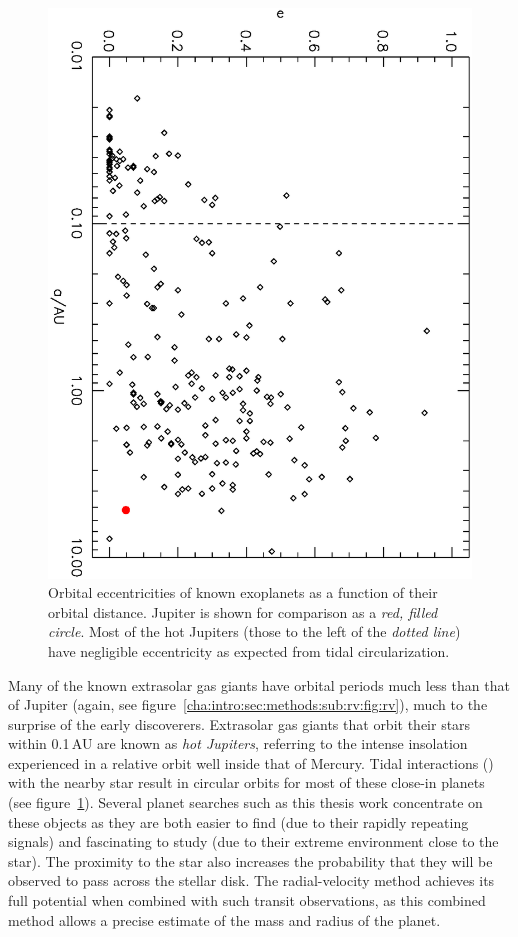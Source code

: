 \begin{figure}
\begin{center}
\centering
\includegraphics[angle=90,width=.90\textwidth]{1_rvplanetseccs}
\caption[Orbital eccentricity distribution of known exoplanets]{%
Orbital eccentricities of known exoplanets as a function of their orbital distance.
Jupiter is shown for comparison as a {\it red, filled circle}.
Most of the hot Jupiters (those to the left of the {\it dotted line}) have negligible eccentricity as expected from tidal circularization.%
}
\label{cha:intro:sec:methods:sub:rv:fig:rve}
\end{center}
\end{figure}

Many of the known extrasolar gas giants have orbital periods much less than that of Jupiter (again, see figure~\ref{cha:intro:sec:methods:sub:rv:fig:rv}), much to the surprise of the early discoverers. 
Extrasolar gas giants that orbit their stars within 0.1\,AU are known as {\it hot Jupiters}, referring to the intense insolation experienced in a relative orbit well inside that of Mercury. 
Tidal interactions (\citealp[see, e.g.,][]{Rasio_Ford:Science:1996a}) with the nearby star result in circular orbits for most of these close-in planets (see figure~\ref{cha:intro:sec:methods:sub:rv:fig:rve}). 
Several planet searches such as this thesis work concentrate on these objects as they are both easier to find (due to their rapidly repeating signals) and fascinating to study (due to their extreme environment close to the star). 
The proximity to the star also increases the probability that they will be observed to pass across the stellar disk.
The radial-velocity method achieves its full potential when combined with such transit observations, as this combined method allows a precise estimate of the mass and radius of the planet.

